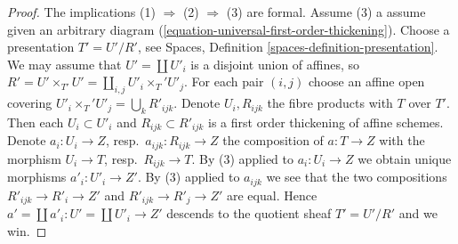 \documentclass[10pt,a4paper]{amsart}
\theoremstyle{plain}
\theoremstyle{definition}
\theoremstyle{remark}
\numberwithin{equation}{subsection}
\begin{document}
\begin{proof}
The implications (1) $\Rightarrow$ (2) $\Rightarrow$ (3) are formal.
Assume (3) a assume given an arbitrary diagram
(\ref{equation-universal-first-order-thickening}).
Choose a presentation $T' = U'/R'$, see
Spaces, Definition \ref{spaces-definition-presentation}.
We may assume that $U' = \coprod U'_i$ is a disjoint union
of affines, so $R' = U' \times_{T'} U' = \coprod_{i, j} U'_i \times_T' U'_j$.
For each pair $(i, j)$ choose an affine open covering
$U'_i \times_T' U'_j = \bigcup_k R'_{ijk}$. Denote $U_i, R_{ijk}$
the fibre products with $T$ over $T'$. Then each
$U_i \subset U'_i$ and $R_{ijk} \subset R'_{ijk}$
is a first order thickening of affine schemes.
Denote $a_i : U_i \to Z$, resp.\ $a_{ijk} : R_{ijk} \to Z$
the composition of $a : T \to Z$ with the morphism
$U_i \to T$, resp.\ $R_{ijk} \to T$.
By (3) applied to $a_i : U_i \to Z$
we obtain unique morphisms $a'_i : U'_i \to Z'$.
By (3) applied to $a_{ijk}$ we see that the two compositions
$R'_{ijk} \to R'_i \to Z'$ and $R'_{ijk} \to R'_j \to Z'$
are equal. Hence $a' = \coprod a'_i : U' = \coprod U'_i \to Z'$
descends to the quotient sheaf $T' = U'/R'$ and we win.
\end{proof}
\end{document}
